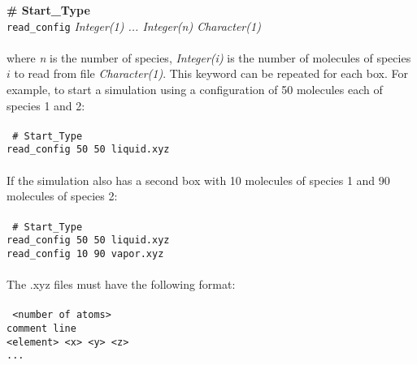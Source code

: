 \begin{itemize}
%
{\bf \# Start\_Type} \\
{\tt read\_config} {\it Integer(1) ... Integer(n) Character(1)}\\ \\
%
where {\it n} is the number of species, {\it Integer(i)} is the number of molecules 
of species $i$ to read from file {\it Character(1)}.
This keyword can be repeated for each box. 
For example, to start a simulation using a configuration of 50 molecules each of species 1 and 2: \\ \\
%
\texttt{
\# Start\_Type \\
read\_config 50 50 liquid.xyz \\} \\
%
If the simulation also has a second box with 10 molecules of species 1 and 90 molecules of species 2: \\ \\ 
%
\texttt{
\# Start\_Type \\
read\_config 50 50 liquid.xyz \\
read\_config 10 90 vapor.xyz \\} \\
%
The .xyz files must have the following format:\\ \\
%
\texttt{
 <number of atoms>\\
 comment line\\
 <element> <x> <y> <z>\\
 ...\\
} \\
%


\end{itemize}
